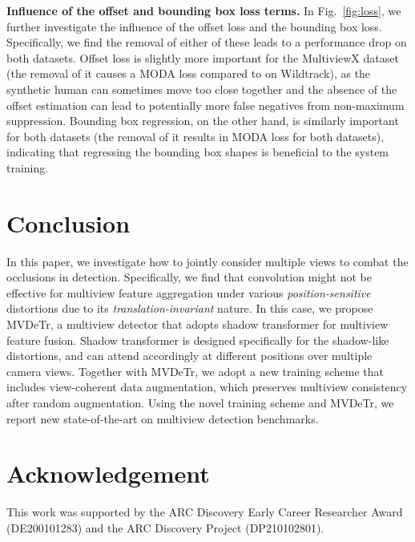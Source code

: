 \documentclass[sigconf,authorversion,nonacm]{acmart}
\begin{document}
\textbf{Influence of the offset and bounding box loss terms.}
In Fig.~\ref{fig:loss}, we further investigate the influence of the offset loss and the bounding box loss. Specifically, we find the removal of either of these leads to a performance drop on both datasets. Offset loss is slightly more important for the MultiviewX dataset (the removal of it causes a  MODA loss compared to  on Wildtrack), as the synthetic human can sometimes move too close together and the absence of the offset estimation can lead to potentially more false negatives from non-maximum suppression. Bounding box regression, on the other hand, is similarly important for both datasets (the removal of it results in  MODA loss for both datasets), indicating that regressing the bounding box shapes is beneficial to the system training. 


\section{Conclusion}
In this paper, we investigate how to jointly consider multiple views to combat the occlusions in detection. Specifically, we find that convolution might not be effective for multiview feature aggregation under various \textit{position-sensitive} distortions due to its \textit{translation-invariant} nature. In this case, we propose MVDeTr, a multiview detector that adopts shadow transformer for multiview feature fusion. Shadow transformer is designed specifically for the shadow-like distortions, and can attend accordingly at different positions over multiple camera views. Together with MVDeTr, we adopt a new training scheme that includes view-coherent data augmentation, which preserves multiview consistency after random augmentation. 
Using the novel training scheme and MVDeTr, we report new state-of-the-art on multiview detection benchmarks. 



\section*{Acknowledgement}
This work was supported by the ARC Discovery Early Career Researcher Award (DE200101283) and the ARC Discovery Project (DP210102801).




\end{document}
